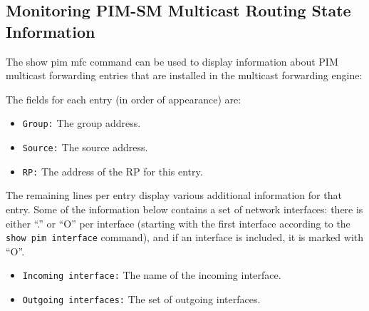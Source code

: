 \subsection{Monitoring PIM-SM Multicast Routing State Information}

The {\stt show pim mfc} command can be used to display
information about PIM multicast forwarding entries that are installed
in the multicast forwarding engine:

\vspace{0.1in}
\noindent{}
\vspace{0.1in}

The fields for each entry (in order of appearance) are:
\begin{itemize}

  \item {\tt Group:} The group address.

  \item {\tt Source:} The source address.

  \item {\tt RP:} The address of the RP for this entry.

\end{itemize}

The remaining lines per entry display various additional information for that
entry. Some of the information below contains a set of network interfaces:
there is either ``.'' or ``O'' per interface (starting with the first
interface according to the {\tt show pim interface} command), and if an
interface is included, it is marked with ``O''.

\begin{itemize}

  \item {\tt Incoming interface:} The name of the incoming interface.

  \item {\tt Outgoing interfaces:} The set of outgoing interfaces.

\end{itemize}

